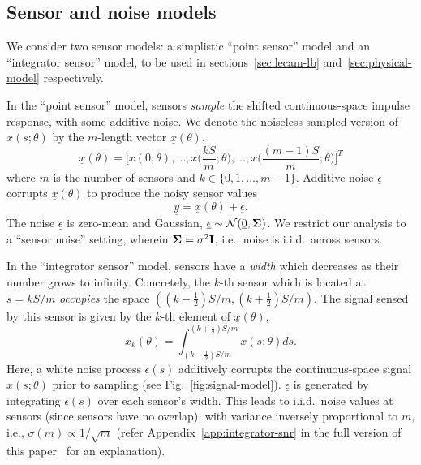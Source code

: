 \documentclass[conference,letterpaper]{IEEEtran}
\providecommand{\v}{}
\renewcommand{\v}[1]{\underline{#1}}
\providecommand{\m}{}
\renewcommand{\m}[1]{{\bf #1}}
\begin{document}
\subsection{Sensor and noise models}
\label{sec:sensor-model}

We consider two sensor models: a simplistic ``point sensor'' model and an
``integrator sensor'' model, to be used in sections~\ref{sec:lecam-lb}
and~\ref{sec:physical-model} respectively.

In the ``point sensor'' model, sensors \emph{sample} the shifted
continuous-space impulse response, with some additive noise. We denote the
noiseless sampled version of $x(s; \theta)$ by the $m$-length vector $\v
x(\theta)$,
\begin{equation} \label{eq:sampled-signal}
	\v x(\theta) = \bigg[x(0; \theta), \ldots, x\Big(\frac{kS}{m}; \theta\Big), \ldots, x\Big(\frac{(m{-}1)S}{m}; \theta\Big)\bigg]^T
\end{equation}
where $m$ is the number of sensors and $k \in \{0, 1, \ldots, m-1\}$. Additive
noise $\v \epsilon$ corrupts $\v x(\theta)$ to produce the noisy sensor values
\begin{equation} \label{eq:sensor-obs}
	\v y = \v x(\theta) + \v \epsilon.
\end{equation}
The noise $\v \epsilon$ is zero-mean and Gaussian, $\v \epsilon \sim
\mathcal{N}(\v 0, \m \Sigma)$. We restrict our analysis to a ``sensor noise''
setting, wherein $\m\Sigma = \sigma^2 \m I$, i.e., noise is i.i.d.\ across
sensors.

In the ``integrator sensor'' model, sensors have a \emph{width} which decreases
as their number grows to infinity. Concretely, the \mbox{$k$-th} sensor which
is located at $s = kS/m$ \emph{occupies} the space $((k{-}\frac{1}{2})S/m,
(k{+}\frac{1}{2})S/m)$.  The signal sensed by this sensor is given by the
$k$-th element of $\v x(\theta)$,
\begin{equation} \label{eq:samples-int-model}
	x_k(\theta) = \int_{(k-\frac{1}{2})S/m}^{(k+\frac{1}{2})S/m} x(s;\theta) ds.
\end{equation}
Here, a white noise process $\epsilon(s)$ additively corrupts the
continuous-space signal $x(s;\theta)$ prior to sampling (see
Fig.~\ref{fig:signal-model}). $\v \epsilon$ is generated by integrating
$\epsilon(s)$ over each sensor's width. This leads to i.i.d.\ noise values at
sensors (since sensors have no overlap), with variance inversely proportional
to $m$, i.e., $\sigma(m) \propto 1/\sqrt{m}$ (refer
Appendix~\ref{app:integrator-snr} in the full version of this
paper~\cite{FullVersion} for an explanation).
\end{document}
